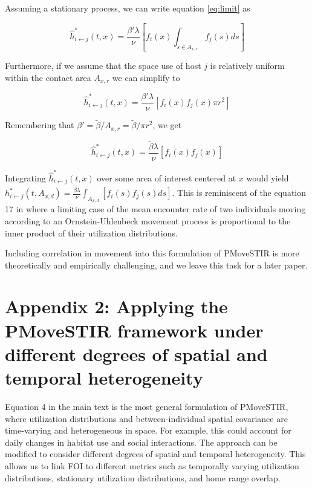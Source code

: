 \documentclass[letterpaper]{article}
\begin{document}
Assuming a stationary process, we can write equation \ref{eq:limit} as

\begin{equation}
    \hat{h}^*_{i \leftarrow j}(t, x) =  \frac{\beta' \lambda}{\nu} [f_i(x) \int_{s \in A_{x, r}} f_j(s) ds]
\end{equation}

Furthermore, if we assume that the space use of host $j$ is relatively uniform within the contact area $A_{x, r}$ we can simplify to

\begin{equation}
    \hat{h}^*_{i \leftarrow j}(t, x) =  \frac{\beta' \lambda}{\nu} [f_i(x) f_j(x) \pi r^2]
\end{equation}

Remembering that $\beta' = \tilde{\beta} / A_{x, r} = \tilde{\beta} / \pi r^2$, we get 

\begin{equation}
    \hat{h}^*_{i \leftarrow j}(t, x) =  \frac{\tilde{\beta} \lambda}{\nu} [f_i(x) f_j(x)]
\end{equation}

Integrating $\hat{h}^*_{i \leftarrow j}(t, x)$ over some area of interest centered at $x$ would yield  $h^*_{i \leftarrow j}(t, A_{x, d}) = \frac{\tilde{\beta} \lambda}{\nu} \int_{A_{x, d}} [f_i(s) f_j(s) ds] $. This is reminiscent of the equation 17 in \cite{Martinez-Garcia2020} where a limiting case of the mean encounter rate of two individuals moving according to an Ornstein-Uhlenbeck movement process is proportional to the inner product of their utilization distributions. 

Including correlation in movement into this formulation of PMoveSTIR is more theoretically and empirically challenging, and we leave this task for a later paper.

\section*{Appendix 2: Applying the PMoveSTIR framework under different degrees of spatial and temporal heterogeneity}

Equation 4 in the main text is the most general formulation of PMoveSTIR, where utilization distributions and between-individual spatial covariance are time-varying and heterogeneous in space. For example, this could account for daily changes in habitat use and social interactions. The approach can be modified to consider different degrees of spatial and temporal heterogeneity. This allows us to link FOI to different metrics such as temporally varying utilization distributions, stationary utilization distributions, and home range overlap. 
\end{document}
